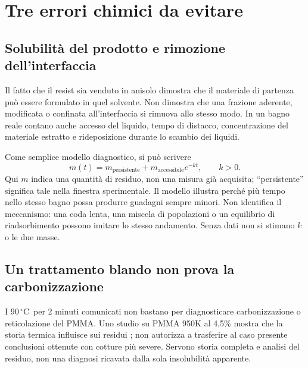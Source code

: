 \documentclass[11pt,reqno]{amsart}
\numberwithin{equation}{section}
\newcommand{\degC}{\ensuremath{^{\circ}\mathrm{C}}}
\begin{document}
\section{Tre errori chimici da evitare}

\subsection{Solubilit\`a del prodotto e rimozione dell'interfaccia}
Il fatto che il resist sia venduto in anisolo dimostra che il materiale
di partenza pu\`o essere formulato in quel solvente. Non dimostra che
una frazione aderente, modificata o confinata all'interfaccia si rimuova
allo stesso modo. In un bagno reale contano anche accesso del liquido,
tempo di distacco, concentrazione del materiale estratto e
rideposizione durante lo scambio dei liquidi.

Come semplice modello diagnostico, si pu\`o scrivere
\begin{equation}\label{eq:plateau}
 m(t)=m_{\mathrm{persistente}}+
       m_{\mathrm{accessibile}}e^{-kt},\qquad k>0.
\end{equation}
Qui $m$ indica una quantit\`a di residuo, non una misura gi\`a acquisita;
``persistente'' significa tale nella finestra sperimentale. Il modello
illustra perch\'e pi\`u tempo nello stesso bagno possa produrre guadagni
sempre minori. Non identifica il meccanismo: una coda lenta, una
miscela di popolazioni o un equilibrio di riadsorbimento possono imitare
lo stesso andamento. Senza dati non si stimano $k$ o le due masse.

\subsection{Un trattamento blando non prova la carbonizzazione}
I 90\,\degC\ per 2 minuti comunicati non bastano per diagnosticare
carbonizzazione o reticolazione del PMMA. Uno studio su PMMA 950K
al 4,5\% mostra che la storia termica influisce sui residui
\cite{Jia2016}; non autorizza a trasferire al caso presente conclusioni
ottenute con cotture pi\`u severe. Servono storia completa e analisi
del residuo, non una diagnosi ricavata dalla sola insolubilit\`a apparente.
\end{document}
